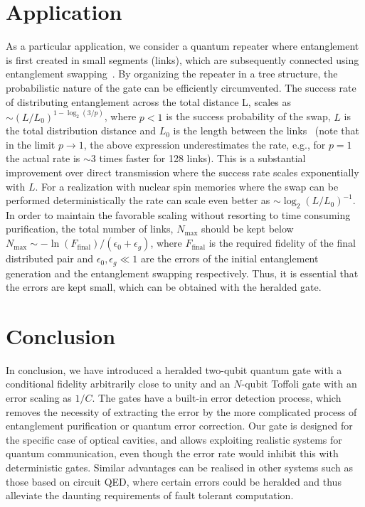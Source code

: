 \section{Application}

As a particular application, we consider a quantum repeater where entanglement
is first created in small segments (links), which are subsequently connected
using entanglement swapping~\cite{briegel}. By organizing the repeater in a tree
structure, the probabilistic nature of the gate can be efficiently circumvented.
The success rate of distributing entanglement across the total distance L,
scales as $\sim (L/L_{0})^{1-\log_{2}(3/p)}$, where $p<1$ is the success
probability of the swap, $L$ is the total distribution distance and $L_{0}$ is
the length between the links~\cite{repeater} (note that in the limit $p\to1$,
the above expression underestimates the rate, e.g., for $p=1$ the actual rate is
$\sim3$ times faster for 128 links). This is a substantial improvement over
direct transmission where the success rate scales exponentially with $L$. For a
realization with nuclear spin memories where the swap can be performed
deterministically the rate can scale even better as
$\sim\log_{2}(L/L_{0})^{-1}$. In order to maintain the favorable scaling without
resorting to time consuming purification, the total number of links,
$N_{\text{max}}$ should be kept below
$N_{\text{max}}\sim-\ln(F_{\text{final}})/(\epsilon_{0}+\epsilon_{g})$, where
$F_{\text{final}}$ is the required fidelity of the final distributed pair and
$\epsilon_{0},\epsilon_{g}\ll1$ are the errors of the initial entanglement
generation and the entanglement swapping respectively. Thus, it is essential
that the errors are kept small, which can be obtained with the heralded gate.

\section{Conclusion}

In conclusion, we have introduced a heralded two-qubit quantum
gate with a conditional fidelity arbitrarily close to unity and an $N$-qubit Toffoli gate
with an error scaling as $1/C$. The gates have a
built-in error detection process, which removes the necessity of extracting the
error by the more complicated process of entanglement purification or quantum
error correction. Our gate is designed for the specific case of optical
cavities, and allows exploiting realistic systems for quantum communication, even though the error rate would inhibit this with deterministic gates. Similar
advantages can be realised in other systems such as those based on circuit QED, where certain errors could be
heralded and thus alleviate the daunting requirements of fault tolerant
computation. 
